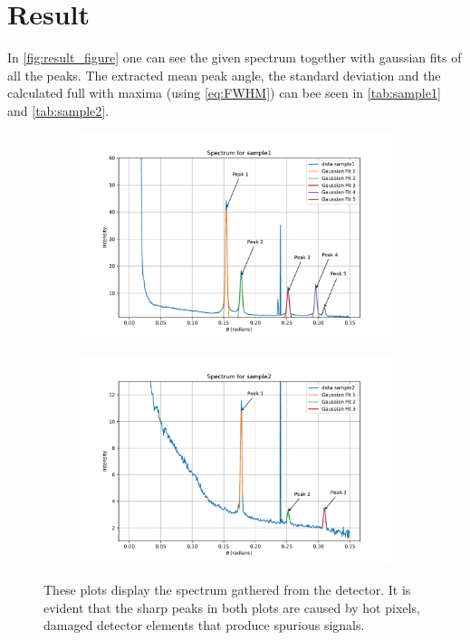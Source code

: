 \newpage
\section{Result}

In \autoref{fig:result_figure} one can see the given spectrum together with gaussian fits of all the peaks. The extracted mean peak angle, the standard deviation and the calculated full with maxima (using \autoref{eq:FWHM}) can bee seen in \autoref{tab:sample1} and \autoref{tab:sample2}. 

\begin{figure}[H]
    \centering
    \begin{subfigure}[b]{0.89\textwidth} 
        \includegraphics[width=\textwidth]{Figures/gaussian_sample1.pdf}
        \label{fig:subfigure1}
    \end{subfigure}
    \begin{subfigure}[b]{0.89\textwidth} 
        \includegraphics[width=\textwidth]{Figures/gaussian_sample2.pdf}
        \label{fig:subfigure2}
    \end{subfigure}
    \caption{These plots display the spectrum gathered from the detector. It is evident that the sharp peaks in both plots are caused by hot pixels, damaged detector elements that produce spurious signals.}
    \label{fig:result_figure}
\end{figure}

